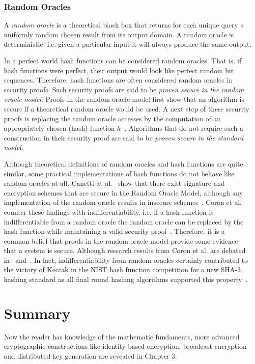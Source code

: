 \subsubsection{Random Oracles}
A \textit{random oracle} is a theoretical black box that returns for each unique query a uniformly random chosen result from its output domain. A random oracle is deterministic, i.e. given a particular input it will always produce the same output.

In a perfect world hash functions can be considered random oracles. That is, if hash functions were perfect, their output would look like perfect random bit sequences. Therefore, hash functions are often considered random oracles in security proofs. Such security proofs are said to be \textit{proven secure in the random oracle model}. Proofs in the random oracle model first show that an algorithm is secure if a theoretical random oracle would be used. A next step of these security proofs is replacing the random oracle accesses by the computation of an appropriately chosen (hash) function $h$~\cite{art:BellareR93}. Algorithms that do not require such a construction in their security proof are said to be \textit{proven secure in the standard model}.

Although theoretical definitions of random oracles and hash functions are quite similar, some practical implementations of hash functions do not behave like random oracles at all. Canetti at al.~\cite{art:CanettiGH04} show that there exist signature and encryption schemes that are secure in the Random Oracle Model, although any implementation of the random oracle results in insecure schemes~\cite{art:CanettiGH04}. Coron et al. counter these findings with indifferentiability, i.e. if a hash function is indifferentiable from a random oracle the random oracle can be replaced by the hash function while maintaining a valid security proof~\cite{art:CoronDMP05}. Therefore, it is a common belief that proofs in the random oracle model provide some evidence that a system is secure. Although research results from Coron et al. are debated in~\cite{art:FleischmannGL10} and~\cite{art:RistenpartSS11}. In fact, indifferentiability from random oracles certainly contributed to the victory of Keccak in the NIST hash function competition for a new SHA-3 hashing standard as all final round hashing algorithms supported this property~\cite{art:BartheGHOB13}.

\section{Summary}
Now the reader has knowledge of the mathematic fundaments, more advanced cryptographic constructions like identity-based encryption, broadcast encryption and distributed key generation are revealed in Chapter 3.

